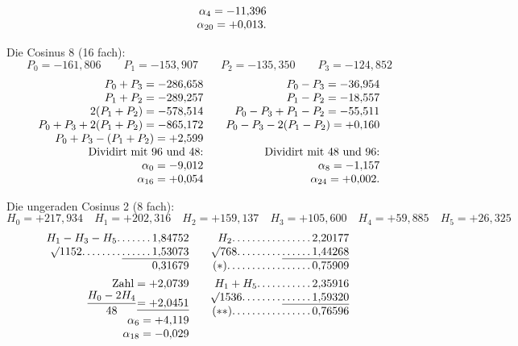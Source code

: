 \begin{landscape}
\[\begin{array}{@{}r@{\qquad}r@{\qquad}r@{}}
&&\alpha_4=-11{,}396\\
&&\alpha_{20}=+0{,}013.
\end{array}
\]
\par\noindent\hspace*{\parindent}Die Cosinus 8 (16 fach):
\[P_0=-161{,}806\qquad P_1=-153{,}907\qquad P_2=-135{,}350\qquad P_3=-124{,}852\]
\[
\begin{array}{@{}r@{\qquad}r@{}}
P_0+P_3=-286{,}658&P_0-P_3=-36{,}954\\
P_1+P_2=-289{,}257&P_1-P_2=-18{,}557\\
2(P_1+P_2)=-578{,}514&P_0-P_3+P_1-P_2=-55{,}511\\
P_0+P_3+2(P_1+P_2)=-865{,}172&P_0-P_3-2(P_1-P_2)=+0{,}160\\
P_0+P_3-(P_1+P_2)=+2{,}599&\\
\text{Dividirt mit 96 und 48:}&\text{Dividirt mit 48 und 96:}\\
\alpha_0=-9{,}012&\alpha_8=-1{,}157\\
\alpha_{16}=+0{,}054&\alpha_{24}=+0{,}002.
\end{array}
\]
\par\noindent\hspace*{\parindent}Die ungeraden Cosinus 2 (8 fach):
\[H_0=+217{,}934\quad H_1=+202{,}316\quad H_2=+159{,}137\quad H_3=+105{,}600\quad H_4=+59{,}885\quad H_5=+26{,}325\]
\[
\begin{array}{@{}r@{\qquad}r@{\qquad}r@{}}
\begin{array}[t]{@{}r@{}}
H_1-H_3-H_5\VfourDots{6}1{,}84752\\
\BareRoot{1152}\VfourDots{7}\underline{\VfourDots{5}1{,}53073}\\
0{,}31679\\[4pt]
\text{Zahl}=+2{,}0739\\
\dfrac{H_0-2H_4}{48}\underline{=+2{,}0451}\\
\alpha_6=+4{,}119\\
\alpha_{18}=-0{,}029
\end{array}
&\begin{array}[t]{@{}r@{}}
H_2\VfourDots{15}2{,}20177\\
\BareRoot{768}\VfourDots{8}\underline{\VfourDots{5}1{,}44268}\\
(*)\VfourDots{16}0{,}75909\\[4pt]
H_1+H_5\VfourDots{10}2{,}35916\\
\BareRoot{1536}\VfourDots{7}\underline{\VfourDots{5}1{,}59320}\\
(**)\VfourDots{15}0{,}76596\\[4pt]

\end{array}
\end{array}\]
\end{landscape}
